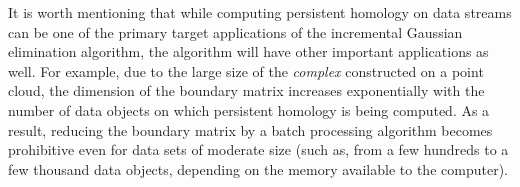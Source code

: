 \documentclass[11pt]{article}
\begin{document}
It is worth mentioning that while computing persistent homology on data streams can be one of the 
primary target applications of the incremental Gaussian elimination algorithm, the algorithm will 
have other important applications as well.  For example, due to the large size of the 
\emph{complex} constructed on a point cloud, the dimension of the boundary matrix increases 
exponentially with the number of data objects on which persistent homology is being computed.  
As a result, reducing the boundary matrix by a batch processing algorithm becomes prohibitive even 
for data sets of moderate size (such as, from a few hundreds to a few thousand data objects, 
depending on the memory available to the computer).





\end{document}
